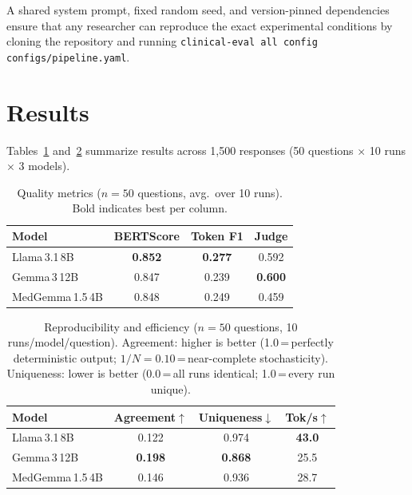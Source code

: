 \documentclass[11pt]{article}
\begin{document}
A shared system prompt, fixed random seed, and version-pinned
dependencies ensure that any researcher can reproduce the exact
experimental conditions by cloning the repository and running
\texttt{clinical-eval all \-\-config configs/pipeline.yaml}.

\section{Results}
\label{sec:results}

Tables~\ref{tab:quality} and~\ref{tab:repro} summarize results
across 1,500 responses (50 questions $\times$ 10 runs $\times$ 3 models).

\begin{table}[h]
\centering
\caption{Quality metrics ($n{=}50$ questions, avg.\ over 10 runs).
Bold indicates best per column.}
\label{tab:quality}
\small
\begin{tabular}{lccc}
\toprule
\textbf{Model} & \textbf{BERTScore} & \textbf{Token F1} & \textbf{Judge} \\
\midrule
Llama\,3.1\,8B      & \textbf{0.852} & \textbf{0.277} & 0.592 \\
Gemma\,3\,12B        & 0.847 & 0.239 & \textbf{0.600} \\
MedGemma\,1.5\,4B   & 0.848 & 0.249 & 0.459 \\
\bottomrule
\end{tabular}
\end{table}

\begin{table}[h]
\centering
\caption{Reproducibility and efficiency ($n{=}50$ questions,
10 runs/model/question). Agreement: higher is better
(1.0\,=\,perfectly deterministic output; $1/N{=}0.10$\,=\,near-complete
stochasticity). Uniqueness: lower is better
(0.0\,=\,all runs identical; 1.0\,=\,every run unique).}
\label{tab:repro}
\small
\begin{tabular}{lccc}
\toprule
\textbf{Model} & \textbf{Agreement$\uparrow$} & \textbf{Uniqueness$\downarrow$} & \textbf{Tok/s$\uparrow$} \\
\midrule
Llama\,3.1\,8B      & 0.122 & 0.974 & \textbf{43.0} \\
Gemma\,3\,12B        & \textbf{0.198} & \textbf{0.868} & 25.5 \\
MedGemma\,1.5\,4B   & 0.146 & 0.936 & 28.7 \\
\bottomrule
\end{tabular}
\end{table}
\end{document}
